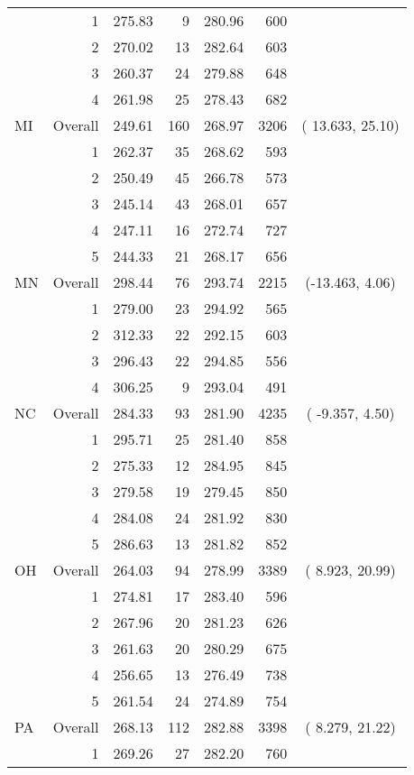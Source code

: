 \begin{longtable}{lrrr@{\extracolsep{.25cm}}rrc}
   & 1 & 275.83 &   9 & 280.96 & 600 &  \\ 
   & 2 & 270.02 &  13 & 282.64 & 603 &  \\ 
   & 3 & 260.37 &  24 & 279.88 & 648 &  \\ 
   & 4 & 261.98 &  25 & 278.43 & 682 &  \\ 
   \hline
MI & Overall & 249.61 & 160 & 268.97 & 3206 & ( 13.633,  25.10) \\ 
   & 1 & 262.37 &  35 & 268.62 & 593 &  \\ 
   & 2 & 250.49 &  45 & 266.78 & 573 &  \\ 
   & 3 & 245.14 &  43 & 268.01 & 657 &  \\ 
   & 4 & 247.11 &  16 & 272.74 & 727 &  \\ 
   & 5 & 244.33 &  21 & 268.17 & 656 &  \\ 
   \hline
MN & Overall & 298.44 &  76 & 293.74 & 2215 & (-13.463,   4.06) \\ 
   & 1 & 279.00 &  23 & 294.92 & 565 &  \\ 
   & 2 & 312.33 &  22 & 292.15 & 603 &  \\ 
   & 3 & 296.43 &  22 & 294.85 & 556 &  \\ 
   & 4 & 306.25 &   9 & 293.04 & 491 &  \\ 
   \hline
NC & Overall & 284.33 &  93 & 281.90 & 4235 & ( -9.357,   4.50) \\ 
   & 1 & 295.71 &  25 & 281.40 & 858 &  \\ 
   & 2 & 275.33 &  12 & 284.95 & 845 &  \\ 
   & 3 & 279.58 &  19 & 279.45 & 850 &  \\ 
   & 4 & 284.08 &  24 & 281.92 & 830 &  \\ 
   & 5 & 286.63 &  13 & 281.82 & 852 &  \\ 
   \hline
OH & Overall & 264.03 &  94 & 278.99 & 3389 & (  8.923,  20.99) \\ 
   & 1 & 274.81 &  17 & 283.40 & 596 &  \\ 
   & 2 & 267.96 &  20 & 281.23 & 626 &  \\ 
   & 3 & 261.63 &  20 & 280.29 & 675 &  \\ 
   & 4 & 256.65 &  13 & 276.49 & 738 &  \\ 
   & 5 & 261.54 &  24 & 274.89 & 754 &  \\ 
   \hline
PA & Overall & 268.13 & 112 & 282.88 & 3398 & (  8.279,  21.22) \\ 
   & 1 & 269.26 &  27 & 282.20 & 760 &  \\ 

\end{longtable}
